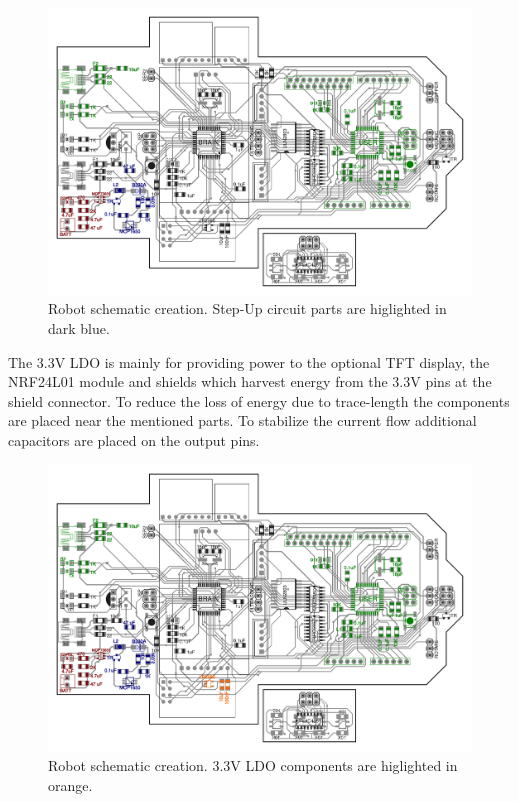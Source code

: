 \documentclass[11pt,a4paper]{article}
\begin{document}
\begin{figure}[H]
  \centering
  \includegraphics[width=\textwidth]{robot_schematic_stepup.pdf}
  \caption{Robot schematic creation. Step-Up circuit parts are higlighted in dark blue.}
\end{figure}

The 3.3V LDO is mainly for providing power to the optional TFT display, the NRF24L01 module and shields which harvest energy from the 3.3V pins at the shield connector. To reduce the loss of energy due to trace-length the components are placed near the mentioned parts. To stabilize the current flow additional capacitors are placed on the output pins. 

\begin{figure}[H]
  \centering
  \includegraphics[width=\textwidth]{robot_schematic_3_3v.pdf}
  \caption{Robot schematic creation. 3.3V LDO components are higlighted in orange.}
\end{figure}
\end{document}
